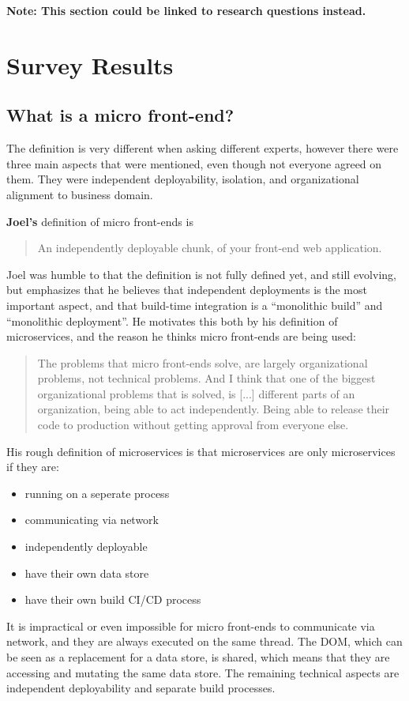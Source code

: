 \textbf{Note: This section could be linked to research questions instead.}

\section{Survey Results}

\subsection{What is a micro front-end?}

The definition is very different when asking different experts, however there were three main aspects that were mentioned, even though not everyone agreed on them. They were independent deployability, isolation, and organizational alignment to business domain.

\textbf{Joel's} definition of micro front-ends is \blockquote{An independently deployable chunk, of your front-end web application.} Joel was humble to that the definition is not fully defined yet, and still evolving, but emphasizes that he believes that independent deployments is the most important aspect, and that build-time integration is a ``monolithic build'' and ``monolithic deployment''. He motivates this both by his definition of microservices, and the reason he thinks micro front-ends are being used:

\blockquote{The problems that micro front-ends solve, are largely organizational problems, not technical problems. And I think that one of the biggest organizational problems that is solved, is [...] different parts of an organization, being able to act independently. Being able to release their code to production without getting approval from everyone else.}

His rough definition of microservices is that microservices are only microservices if they are:

\begin{itemize}
    \item running on a seperate process
    \item communicating via network
    \item independently deployable
    \item have their own data store
    \item have their own build CI/CD process
\end{itemize}
It is impractical or even impossible for micro front-ends to communicate via network, and they are always executed on the same thread. The \ac{DOM}, which can be seen as a replacement for a data store, is shared, which means that they are accessing and mutating the same data store. The remaining technical aspects are independent deployability and separate build processes.

